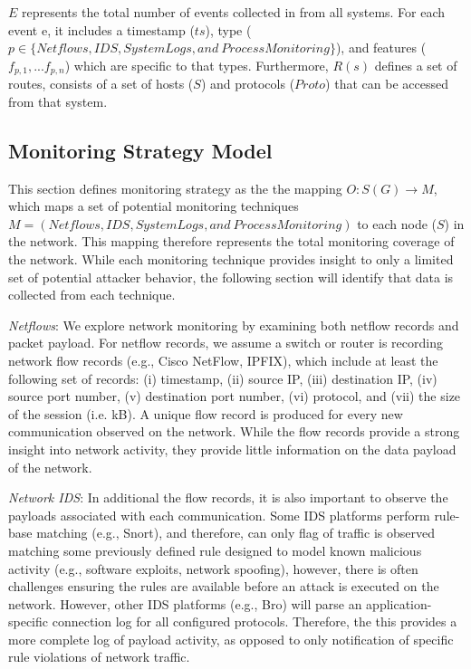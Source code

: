 \documentclass[journal]{IEEEtran}
\begin{document}
$E$ represents the total number of events collected in from all systems. For each event e, it includes a timestamp ($ts$), type ($p \in  \{Netflows, IDS, System Logs, and\ Process Monitoring\}$), and features ($f_{p,1}, ... f_{p,n}$) which are specific to that types. Furthermore, $R(s)$ defines a set of routes, consists of a set of hosts ($S$) and protocols ($Proto$) that can be accessed from that system. 

\subsection{Monitoring  Strategy Model}
This section defines monitoring strategy as the the mapping $O: S(G) \rightarrow M$, which maps a set of potential monitoring techniques $M = (Netflows, IDS, System Logs, and\ Process Monitoring)$ to each node ($S$) in the network.  This mapping therefore represents the total monitoring coverage of the network. While each monitoring technique provides insight to only a limited set of potential attacker behavior, the following section will identify that data is collected from each technique. 

{\it Netflows}: We explore network monitoring by examining both netflow records and packet payload. For netflow records, we assume a switch or router is recording network flow records (e.g., Cisco NetFlow, IPFIX), which include at least the following set of records: (i) timestamp, (ii) source IP, (iii) destination IP, (iv) source port number, (v) destination port number, (vi)  protocol, and (vii) the size of the session (i.e. kB). A unique flow record is produced for every new communication observed on the network. While the flow records provide a strong insight into network activity, they provide little information on the data payload of the network. 

{\it Network IDS}: In additional the flow records, it is also important to observe the payloads associated with each communication. Some IDS platforms perform rule-base matching (e.g., Snort), and therefore, can only flag of traffic is observed matching some previously defined rule designed to model known malicious activity (e.g., software exploits, network spoofing), however, there is often challenges ensuring the rules are available before an attack is executed on the network. However, other IDS platforms (e.g., Bro) will parse an application-specific  connection log for all configured protocols. Therefore, the this provides a more complete log of payload activity, as opposed to only notification of specific rule violations of network traffic. 
\end{document}
